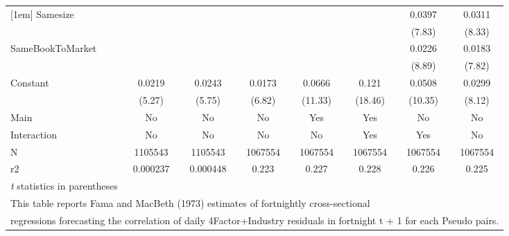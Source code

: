 {\begin{tabular}{l*{7}{c}}
[1em]
Samesize            &                     &                     &                     &                     &                     &      0.0397\sym{***}&      0.0311\sym{***}\\
                    &                     &                     &                     &                     &                     &      (7.83)         &      (8.33)         \\
[1em]
SameBookToMarket    &                     &                     &                     &                     &                     &      0.0226\sym{***}&      0.0183\sym{***}\\
                    &                     &                     &                     &                     &                     &      (8.89)         &      (7.82)         \\
[1em]
Constant            &      0.0219\sym{***}&      0.0243\sym{***}&      0.0173\sym{***}&      0.0666\sym{***}&       0.121\sym{***}&      0.0508\sym{***}&      0.0299\sym{***}\\
                    &      (5.27)         &      (5.75)         &      (6.82)         &     (11.33)         &     (18.46)         &     (10.35)         &      (8.12)         \\
\hline
Main                &          No         &          No         &          No         &         Yes         &         Yes         &          No         &          No         \\
Interaction         &          No         &          No         &          No         &          No         &         Yes         &         Yes         &          No         \\
N                   &     1105543         &     1105543         &     1067554         &     1067554         &     1067554         &     1067554         &     1067554         \\
r2                  &    0.000237         &    0.000448         &       0.223         &       0.227         &       0.228         &       0.226         &       0.225         \\
\hline\hline
\multicolumn{8}{l}{\footnotesize \textit{t} statistics in parentheses}\\
\multicolumn{8}{l}{\footnotesize This table reports Fama and MacBeth (1973) estimates of fortnightly cross-sectional}\\
\multicolumn{8}{l}{\footnotesize  regressions forecasting the correlation of daily 4Factor+Industry residuals in fortnight t + 1 for each Pseudo pairs.}\\

\end{tabular}}
